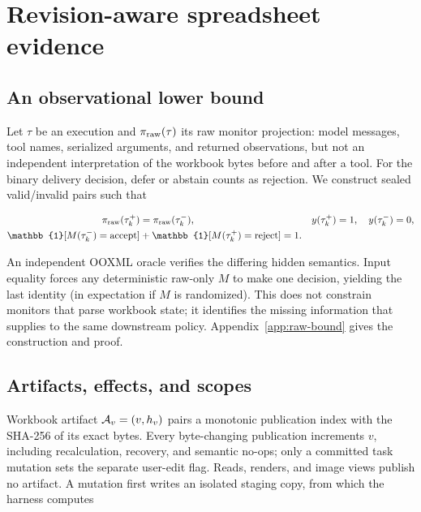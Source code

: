 \section{Revision-aware spreadsheet evidence}
\label{sec:method}

\subsection{An observational lower bound}

Let $\tau$ be an execution and $\pi_{\rm raw}(\tau)$ its raw monitor
projection: model messages, tool names, serialized arguments, and returned
observations, but not an independent interpretation of the workbook bytes
before and after a tool. For the binary delivery decision, defer or abstain
counts as rejection. We construct sealed valid/invalid pairs such that

\begin{equation}
  \begin{aligned}
    \pi_{\rm raw}(\tau_k^+) &= \pi_{\rm raw}(\tau_k^-),
    &y(\tau_k^+)&=1,\quad y(\tau_k^-)=0,\\
    \mathbb{1}[M(\tau_k^-)=\mathrm{accept}]
    &+\mathbb{1}[M(\tau_k^+)=\mathrm{reject}]=1.
  \end{aligned}
  \label{eq:raw-lower-bound}
\end{equation}

An independent OOXML oracle verifies the differing hidden semantics. Input
equality forces any deterministic raw-only $M$ to make one decision, yielding
the last identity (in expectation if $M$ is randomized). This does not constrain
monitors that parse workbook state; it identifies the missing information that
\method{} supplies to the same downstream policy. Appendix~\ref{app:raw-bound}
gives the construction and proof.

\subsection{Artifacts, effects, and scopes}

Workbook artifact $\mathcal{A}_v=(v,h_v)$ pairs a monotonic publication index
with the SHA-256 of its exact bytes. Every byte-changing publication increments
$v$, including recalculation, recovery, and semantic no-ops; only a committed
task mutation sets the separate user-edit flag. Reads, renders, and image views
publish no artifact. A mutation first writes an isolated staging copy, from
which the harness computes

